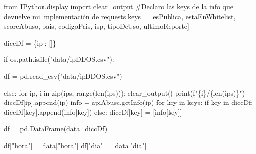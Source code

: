 \documentclass[
  letterpaper,
  DIV=11,
  numbers=noendperiod]{scrartcl}
\newenvironment{Shaded}{\begin{snugshade}}{\end{snugshade}}
\newcommand{\BuiltInTok}[1]{\textcolor[rgb]{0.00,0.23,0.31}{#1}}
\newcommand{\CommentTok}[1]{\textcolor[rgb]{0.37,0.37,0.37}{#1}}
\newcommand{\ControlFlowTok}[1]{\textcolor[rgb]{0.00,0.23,0.31}{#1}}
\newcommand{\ImportTok}[1]{\textcolor[rgb]{0.00,0.46,0.62}{#1}}
\newcommand{\KeywordTok}[1]{\textcolor[rgb]{0.00,0.23,0.31}{#1}}
\newcommand{\NormalTok}[1]{\textcolor[rgb]{0.00,0.23,0.31}{#1}}
\newcommand{\OperatorTok}[1]{\textcolor[rgb]{0.37,0.37,0.37}{#1}}
\newcommand{\SpecialCharTok}[1]{\textcolor[rgb]{0.37,0.37,0.37}{#1}}
\newcommand{\SpecialStringTok}[1]{\textcolor[rgb]{0.13,0.47,0.30}{#1}}
\newcommand{\StringTok}[1]{\textcolor[rgb]{0.13,0.47,0.30}{#1}}
\begin{document}
\begin{Shaded}
\begin{Highlighting}[]
\ImportTok{from}\NormalTok{ IPython.display }\ImportTok{import}\NormalTok{ clear\_output}
\CommentTok{\#Declaro las keys de la info que devuelve mi implementación de requests}
\NormalTok{keys }\OperatorTok{=}\NormalTok{ [}\StringTok{\textquotesingle{}esPublica\textquotesingle{}}\NormalTok{, }\StringTok{\textquotesingle{}estaEnWhitelist\textquotesingle{}}\NormalTok{, }\StringTok{\textquotesingle{}scoreAbuso\textquotesingle{}}\NormalTok{, }\StringTok{\textquotesingle{}pais\textquotesingle{}}\NormalTok{, }\StringTok{\textquotesingle{}codigoPais\textquotesingle{}}\NormalTok{, }\StringTok{\textquotesingle{}isp\textquotesingle{}}\NormalTok{, }\StringTok{\textquotesingle{}tipoDeUso\textquotesingle{}}\NormalTok{, }\StringTok{\textquotesingle{}ultimoReporte\textquotesingle{}}\NormalTok{]}

\NormalTok{diccDf }\OperatorTok{=}\NormalTok{ \{}\StringTok{\textquotesingle{}ip\textquotesingle{}}\NormalTok{ : []\}}

\ControlFlowTok{if}\NormalTok{ os.path.isfile(}\StringTok{"data/ipDDOS.csv"}\NormalTok{):}
    
\NormalTok{    df }\OperatorTok{=}\NormalTok{ pd.read\_csv(}\StringTok{"data/ipDDOS.csv"}\NormalTok{)}
    
\ControlFlowTok{else}\NormalTok{:}
    \ControlFlowTok{for}\NormalTok{ ip, i }\KeywordTok{in} \BuiltInTok{zip}\NormalTok{(ips, }\BuiltInTok{range}\NormalTok{(}\BuiltInTok{len}\NormalTok{(ips))):}
\NormalTok{        clear\_output()}
        \BuiltInTok{print}\NormalTok{(}\SpecialStringTok{f"}\SpecialCharTok{\{}\NormalTok{i}\SpecialCharTok{\}}\SpecialStringTok{/}\SpecialCharTok{\{}\BuiltInTok{len}\NormalTok{(ips)}\SpecialCharTok{\}}\SpecialStringTok{"}\NormalTok{)}
\NormalTok{        diccDf[}\StringTok{\textquotesingle{}ip\textquotesingle{}}\NormalTok{].append(ip)}
\NormalTok{        info }\OperatorTok{=}\NormalTok{ apiAbuse.getInfo(ip)}
        \ControlFlowTok{for}\NormalTok{ key }\KeywordTok{in}\NormalTok{ keys:}
            \ControlFlowTok{if}\NormalTok{ key }\KeywordTok{in}\NormalTok{ diccDf:}
\NormalTok{                diccDf[key].append(info[key])}
            \ControlFlowTok{else}\NormalTok{:}
\NormalTok{                diccDf[key] }\OperatorTok{=}\NormalTok{ [info[key]]}

\NormalTok{    df }\OperatorTok{=}\NormalTok{ pd.DataFrame(data}\OperatorTok{=}\NormalTok{diccDf)}
    
    
\NormalTok{df[}\StringTok{"hora"}\NormalTok{] }\OperatorTok{=}\NormalTok{ data[}\StringTok{"hora"}\NormalTok{]}
\NormalTok{df[}\StringTok{"dia"}\NormalTok{] }\OperatorTok{=}\NormalTok{ data[}\StringTok{"dia"}\NormalTok{]}
\end{Highlighting}
\end{Shaded}
\end{document}

